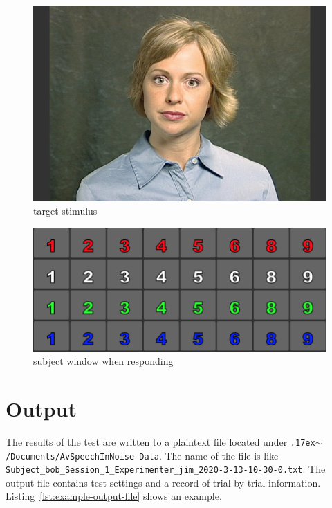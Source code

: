 \documentclass[11pt,pdftex,letterpaper]{article}
\newcommand{\mytilde}{\raise.17ex\hbox{$\scriptstyle\mathtt{\sim}$}}
\begin{document}
\begin{figure}
\centering
\includegraphics[width = 0.9\linewidth]{target-stimulus.png}
\caption{target stimulus}
\label{fig:target-stimulus}
\end{figure}

\begin{figure}
\centering
\includegraphics[width = 0.9\linewidth]{subject-response-window.png}
\caption{subject window when responding}
\label{fig:subject-response-window}
\end{figure}

\section{Output}
The results of the test are written to a plaintext file located under \texttt{\mytilde/Documents/AvSpeechInNoise Data}. The name of the file is like \texttt{Subject\_bob\_Session\_1\_Experimenter\_jim\_2020-3-13-10-30-0.txt}. The output file contains test settings and a record of trial-by-trial information. Listing~\ref{lst:example-output-file} shows an example.

\noindent\begin{minipage}{\textwidth}

\end{minipage}
\end{document}
